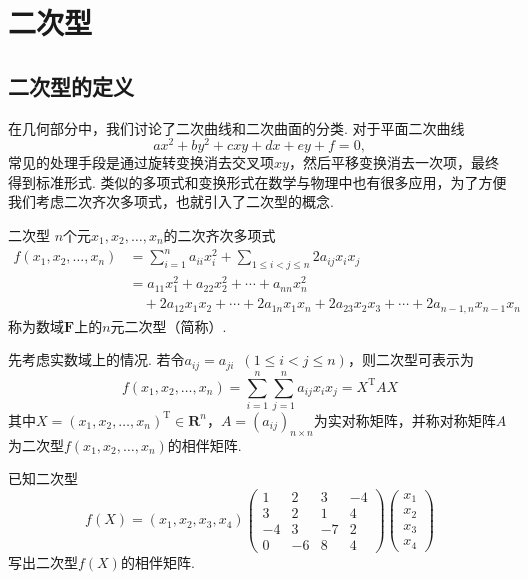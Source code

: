 \chapter{二次型}

\section{二次型的定义}

在几何部分中，我们讨论了二次曲线和二次曲面的分类. 对于平面二次曲线
\[ax^2 + by^2 + cxy + dx + ey + f = 0,\]
常见的处理手段是通过旋转变换消去交叉项$xy$，然后平移变换消去一次项，最终得到标准形式. 类似的多项式和变换形式在数学与物理中也有很多应用，为了方便我们考虑二次齐次多项式，也就引入了二次型的概念.

\begin{definition}{二次型}{} 
    $n$个元$x_1,x_2,\ldots,x_n$的二次齐次多项式
    \begin{align*}
        f(x_1,x_2,\ldots,x_n) & = \sum_{i=1}^{n}a_{ii}x_i^2+\sum\limits_{1\leqslant i<j\leqslant n}2a_{ij}x_ix_j    \\
                              & = a_{11}x_1^2+a_{22}x_2^2+\cdots+a_{nn}x_n^2                                        \\
                              & \quad +2a_{12}x_1x_2+\cdots+2a_{1n}x_1x_n+2a_{23}x_2x_3+\cdots+2a_{n-1,n}x_{n-1}x_n
    \end{align*}
    称为数域$\mathbf{F}$上的$n$元二次型（简称）.
\end{definition}
先考虑实数域上的情况. 若令$a_{ij}=a_{ji}\enspace(1\leqslant i<j\leqslant n)$，则二次型可表示为
\[f(x_1,x_2,\ldots,x_n)=\sum_{i=1}^{n}\sum_{j=1}^{n}a_{ij}x_ix_j=X^\mathrm{T}AX\]
其中$X=(x_1,x_2,\ldots,x_n)^\mathrm{T}\in\mathbf{R}^n$，$A=(a_{ij})_{n\times n}$为实对称矩阵，并称对称矩阵$A$为二次型$f(x_1,x_2,\ldots,x_n)$的相伴矩阵.

\begin{example}{}{}
    已知二次型
    \[f(X)=(x_1,x_2,x_3,x_4)\begin{pmatrix}
            1 & 2 & 3 & -4 \\ 3 & 2 & 1 & 4 \\ -4 & 3 & -7 & 2 \\ 0 & -6 & 8 & 4
        \end{pmatrix}\begin{pmatrix}
            x_1 \\ x_2 \\ x_3 \\ x_4
        \end{pmatrix}\]
    写出二次型$f(X)$的相伴矩阵.
\end{example}

